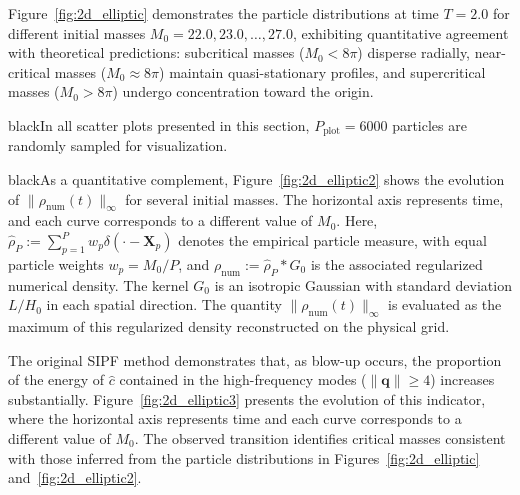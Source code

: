 \documentclass[review,onefignum,onetabnum]{siamart250211}
\begin{document}
Figure~\ref{fig:2d_elliptic} demonstrates the particle distributions at time \( T = 2.0 \) for different initial masses \( M_0 = 22.0, 23.0, \ldots, 27.0 \), exhibiting quantitative agreement with theoretical predictions: subcritical masses (\( M_0 < 8\pi \)) disperse radially, near-critical masses (\( M_0 \approx 8\pi \)) maintain quasi-stationary profiles, and supercritical masses (\( M_0 > 8\pi \)) undergo concentration toward the origin. \begin{color}{black}In all scatter plots presented in this section, $P_{\mathrm{plot}}=6000$ particles are randomly sampled for visualization.\end{color}

\begin{color}{black}As a quantitative complement, Figure~\ref{fig:2d_elliptic2} shows the evolution of $\|\rho_{\mathrm{num}}(t)\|_{\infty}$ for several initial masses. The horizontal axis represents time, and each curve corresponds to a different value of $M_0$. Here, $\widehat{\rho}_P:=\sum_{p=1}^{P}w_p\delta(\cdot -\mathbf X_p)$ denotes the empirical particle measure, with equal particle weights $w_p=M_0/P$, and $\rho_{\mathrm{num}}:=\widehat{\rho}_P*G_0$ is the associated regularized numerical density. The kernel $G_0$ is an isotropic Gaussian with standard deviation $L/H_0$ in each spatial direction. The quantity $\|\rho_{\mathrm{num}}(t)\|_{\infty}$ is evaluated as the maximum of this regularized density reconstructed on the physical grid.

The original SIPF method \cite{SIPF1} demonstrates that, as blow-up occurs, the proportion of the energy of \(\widehat{c}\) contained in the high-frequency modes ($\|\mathbf{q}\|\geq 4$) increases substantially. Figure~\ref{fig:2d_elliptic3} presents the evolution of this indicator, where the horizontal axis represents time and each curve corresponds to a different value of $M_0$. The observed transition identifies critical masses consistent with those inferred from the particle distributions in Figures~\ref{fig:2d_elliptic} and~\ref{fig:2d_elliptic2}.
\end{color}
\end{document}
